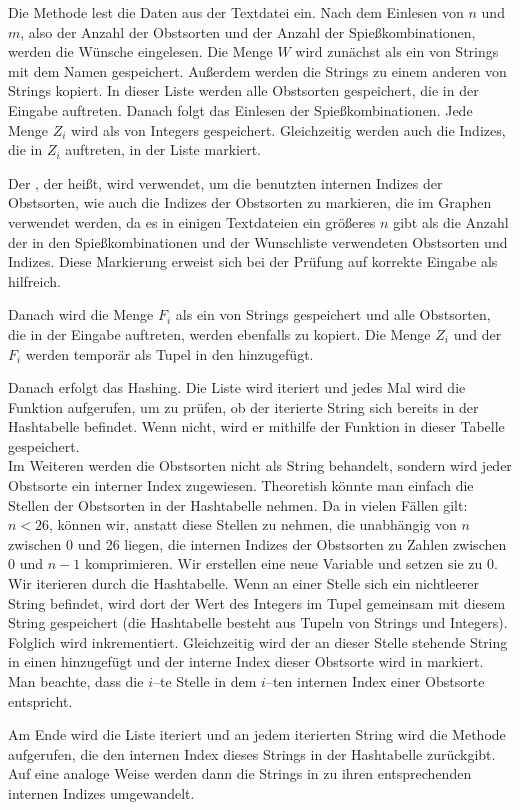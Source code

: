 Die Methode  lest die Daten aus der Textdatei ein. 
Nach dem Einlesen von $n$ und $m$, also der Anzahl der Obstsorten und der Anzahl der Spießkombinationen,
werden die Wünsche eingelesen.
Die Menge $W$ wird zunächst als ein  von Strings mit dem Namen  gespeichert.
Außerdem werden die Strings zu einem anderen  von Strings  kopiert.
In dieser Liste werden alle Obstsorten gespeichert, die in der Eingabe auftreten. 
Danach folgt das Einlesen der Spießkombinationen.
Jede Menge $Z_i$ wird als  von Integers gespeichert.
Gleichzeitig werden auch die Indizes, die in $Z_i$ auftreten, in der Liste  markiert.

Der , der  heißt, wird verwendet, um die benutzten internen Indizes der Obstsorten,
wie auch die Indizes der Obstsorten zu markieren, die im Graphen verwendet werden,
da es in einigen Textdateien ein größeres $n$ gibt als die Anzahl der in den Spießkombinationen 
und der Wunschliste verwendeten Obstsorten und Indizes. 
Diese Markierung erweist sich bei der Prüfung auf korrekte Eingabe als hilfreich.

Danach wird die Menge $F_i$ als ein  von Strings gespeichert und 
alle Obstsorten, die in der Eingabe auftreten, werden ebenfalls zu  kopiert.
Die Menge $Z_i$ und der  $F_i$ werden temporär als Tupel in den 
 hinzugefügt.

Danach erfolgt das Hashing. Die Liste  wird iteriert und jedes Mal wird
die Funktion  aufgerufen, um zu prüfen, ob der iterierte String sich bereits
in der Hashtabelle befindet. Wenn nicht, wird er mithilfe der Funktion  
in dieser Tabelle gespeichert.\\
Im Weiteren werden die Obstsorten nicht als String behandelt, sondern wird jeder Obstsorte
ein interner Index zugewiesen. Theoretish könnte man einfach die Stellen der Obstsorten in der Hashtabelle 
nehmen.
Da in vielen Fällen gilt: $n < 26$, können wir, anstatt diese Stellen zu nehmen, die unabhängig von $n$
zwischen 0 und 26 liegen, die internen Indizes der Obstsorten zu Zahlen zwischen 0 und $n-1$
komprimieren. Wir erstellen eine neue Variable  und setzen sie zu 0. Wir iterieren durch die Hashtabelle. 
Wenn an einer Stelle sich ein nichtleerer String befindet, wird dort der Wert des Integers
im Tupel gemeinsam mit diesem String gespeichert (die Hashtabelle besteht aus Tupeln von Strings und Integers). 
Folglich wird  inkrementiert.
Gleichzeitig wird der an dieser Stelle stehende String in einen   hinzugefügt und
der interne Index dieser Obstsorte wird in  markiert.
Man beachte, dass die $i$--te Stelle in  dem $i$--ten internen Index einer Obstsorte entspricht. 

Am Ende wird die Liste  iteriert und an jedem iterierten String wird
die Methode  aufgerufen, die den internen Index dieses Strings in der Hashtabelle zurückgibt.
Auf eine analoge Weise werden dann die Strings in  zu ihren entsprechenden
internen Indizes umgewandelt.




